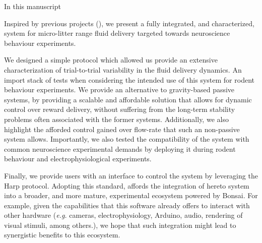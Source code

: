 In this manuscript 
 
Inspired by previous projects (\citep{Amarante2019, Wijnen2014}), we present a fully integrated, and characterized, system for micro-litter range fluid delivery targeted towards neuroscience behaviour experiments. 
 
We designed a simple protocol which allowed us provide an extensive characterization of trial-to-trial variability in the fluid delivery dynamics. An import stack of tests when considering the intended use of this system for rodent behaviour experiments.
We provide an alternative to gravity-based passive systems, by providing a scalable and affordable solution that allows for dynamic control over reward delivery, without suffering from the long-term stability problems often associated with the former systems. Additionally, we also highlight the afforded control gained over flow-rate that such an non-passive system allows.
Importantly, we also tested the compatibility of the system with common neuroscience experimental demands by deploying it during rodent behaviour and electrophysiological experiments.

Finally, we provide users with an interface to control the system by leveraging the Harp protocol. Adopting this standard, affords the integration of hereto system into a broader, and more mature, experimental ecosystem powered by Bonsai. For example, given the capabilities that this software already offers to interact with other hardware (\textit{e.g.} cameras, electrophysiology, Arduino, audio, rendering of visual stimuli, among others.), we hope that such integration might lead to synergistic benefits to this ecosystem. 